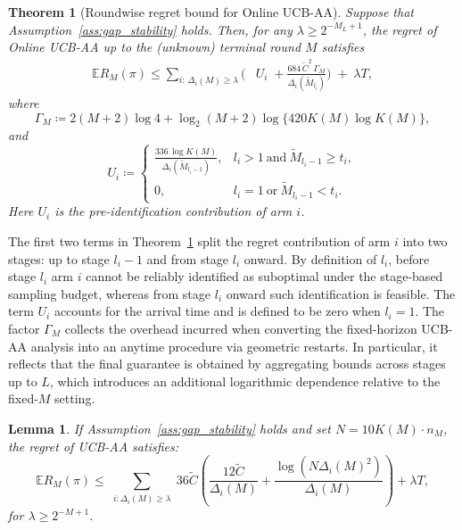\documentclass[
  12pt]{article}
\newtheorem{theorem}{Theorem}
\newtheorem{lemma}{Lemma}
\begin{document}
\begin{theorem}[Roundwise regret bound for Online UCB-AA]
\label{thm:online-ucb-aa-upper}
Suppose that Assumption~\ref{ass:gap_stability} holds. Then, for any
$\lambda \ge 2^{-M_L+1}$, the regret of Online UCB-AA up to the
(unknown) terminal round $M$ satisfies
\begin{align*}
\mathbb{E}R_M(\pi)
\le
\sum_{i:\,\Delta_i(M)\ge \lambda}
\Biggl(
&U_i
\;+\frac{684\,\tilde{C}^2\,\Gamma_M}{\Delta_i(\tilde{M}_{l_i})}
\Biggr)
\;+\;\lambda T,
\end{align*}
where
\[
\Gamma_M
\coloneqq
2(M+2)\log 4
+\log_2(M+2)\log\{420K(M)\log K(M)\},
\]
and
\[
U_i\coloneqq
\begin{cases}
\displaystyle
\frac{336\,\log K(M)}{\Delta_i(\tilde M_{l_i-1})},
& l_i>1\ \text{and}\ \tilde M_{l_i-1}\ge t_i,\\[1.2ex]
0, & l_i=1\ \text{or}\ \tilde M_{l_i-1}<t_i.
\end{cases}
\]
Here \(U_i\) is the pre-identification contribution of arm \(i\).
\end{theorem}


The first two terms in Theorem~\ref{thm:online-ucb-aa-upper} split the regret contribution of arm $i$ into two stages: up to stage $l_i-1$ and from stage $l_i$ onward. By definition of $l_i$, before stage $l_i$ arm $i$ cannot be reliably identified as suboptimal under the stage-based sampling budget, whereas from stage $l_i$ onward such identification is feasible. The term $U_i$ accounts for the arrival time and is defined to be zero when $l_i=1$. The factor $\Gamma_M$ collects the overhead incurred when converting the fixed-horizon UCB-AA analysis into an anytime procedure via geometric restarts. In particular, it reflects that the final guarantee is obtained by aggregating bounds across stages up to $L$, which introduces an additional logarithmic dependence relative to the fixed-$M$ setting.


\begin{lemma}
\label{lemma1 of online}
If Assumption~\ref{ass:gap_stability} holds and set  $N=10 K(M)\cdot n_M$, the regret of UCB-AA satisfies: 
\[\mathbb{E}R_M(\pi)\leq\sum_{\substack{i: \Delta_i(M) \geq \lambda}} 36\tilde{C}\left(\frac{12\tilde{C}}{\Delta_i(M)}+\frac{\log(N \Delta_i(M)^2)}{\Delta_i(M)}\right)+\lambda T,\]
for $\lambda\geq 2^{-M+1}$.
\end{lemma}
\end{document}
